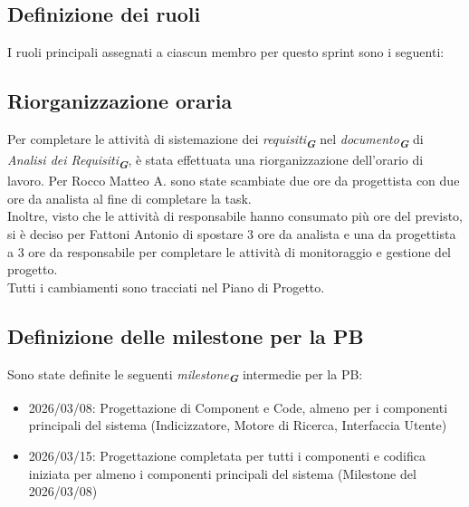 \documentclass[a4paper,12pt]{article}
\newcommand{\glossario}[1]{\textit{#1}\textsubscript{\textbf{\textit{\textcolor{lightblack}{G}}}}}
\begin{document}
\subsection{Definizione dei ruoli}
I ruoli principali assegnati a ciascun membro per questo sprint sono i seguenti:
\begin{table}[H]
\end{table}


\subsection{Riorganizzazione oraria}
Per completare le attività di sistemazione dei \glossario{requisiti} nel \glossario{documento} di \glossario{Analisi dei Requisiti}, è stata effettuata una riorganizzazione dell'orario di lavoro. Per Rocco Matteo A. sono state scambiate due ore da progettista con due ore da analista al fine di completare la task. \\
Inoltre, visto che le attività di responsabile hanno consumato più ore del previsto, si è deciso per Fattoni Antonio di spostare 3 ore da analista e una da progettista a 3 ore da responsabile per completare le attività di monitoraggio e gestione del progetto.
\\ Tutti i cambiamenti sono tracciati  nel Piano di Progetto.

\subsection{Definizione delle milestone per la PB}
Sono state definite le seguenti \glossario{milestone} intermedie per la PB:
\begin{itemize}
    \item 2026/03/08: Progettazione di Component e Code, almeno per i componenti principali del sistema (Indicizzatore, Motore di Ricerca, Interfaccia Utente)
    \item 2026/03/15: Progettazione completata per tutti i componenti e codifica iniziata per almeno i componenti principali del sistema (Milestone del 2026/03/08)
\end{itemize}
\end{document}
